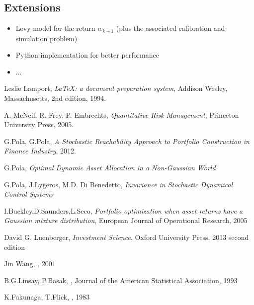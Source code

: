 \documentclass[]{article}
\begin{document}
\subsection{Extensions}
\begin{itemize}
	\item Levy model for the return $ w_{k+1}$ (plus the associated calibration and simulation problem)
	\item Python implementation for better performance
	\item $ \dots$
\end{itemize}
\begin{thebibliography}{9}
	
	Leslie Lamport,
	\textit{\LaTeX: a document preparation system},
	Addison Wesley, Massachusetts,
	2nd edition,
	1994.
	
	A. McNeil, R. Frey, P. Embrechts,
	\textit{Quantitative Risk Management},
	Princeton University Press,
	2005.
	
	G.Pola, G.Pola,
	\textit{A Stochastic Reachability Approach to Portfolio Construction in Finance Industry},
	2012.
	
	G.Pola,
	\textit{Optimal Dynamic Asset Allocation in a Non-Gaussian World}
	
	
	G.Pola, J.Lygeros, M.D. Di Benedetto,
	\textit{Invariance in Stochastic Dynamical Control Systems}
	
	I.Buckley,D.Saunders,L.Seco,
	\textit{Portfolio optimization when asset returns have a Gaussian mixture distribution},
	European Journal of Operational Research,
	2005
	
	David G. Luenberger,
	\textit{Investment Science},
	Oxford University Press,
	2013 second edition
	
	Jin Wang,
	,
	2001
	
	B.G.Linsay, P.Basak,
	,
	Journal of the American Statistical Association,
	1993
	
	K.Fukunaga, T.Flick,
	,
	1983
\end{thebibliography}
\end{document}
